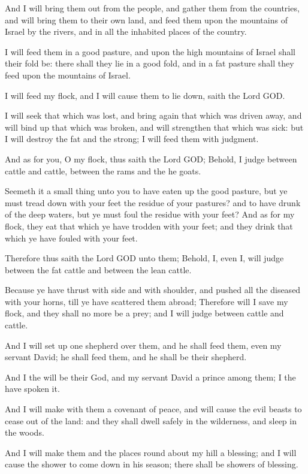 \verse And I will bring them out from the people, and gather them from the countries, and will bring them to their own land, and feed them upon the mountains of Israel by the rivers, and in all the inhabited places of the country.

\verse I will feed them in a good pasture, and upon the high mountains of Israel shall their fold be: there shall they lie in a good fold, and in a fat pasture shall they feed upon the mountains of Israel.

\verse I will feed my flock, and I will cause them to lie down, saith the Lord GOD.

\verse I will seek that which was lost, and bring again that which was driven away, and will bind up that which was broken, and will strengthen that which was sick: but I will destroy the fat and the strong; I will feed them with judgment.

\verse And as for you, O my flock, thus saith the Lord GOD; Behold, I judge between cattle and cattle, between the rams and the he goats.

\verse Seemeth it a small thing unto you to have eaten up the good pasture, but ye must tread down with your feet the residue of your pastures? and to have drunk of the deep waters, but ye must foul the residue with your feet?  \verse And as for my flock, they eat that which ye have trodden with your feet; and they drink that which ye have fouled with your feet.

\verse Therefore thus saith the Lord GOD unto them; Behold, I, even I, will judge between the fat cattle and between the lean cattle.

\verse Because ye have thrust with side and with shoulder, and pushed all the diseased with your horns, till ye have scattered them abroad; \verse Therefore will I save my flock, and they shall no more be a prey; and I will judge between cattle and cattle.

\verse And I will set up one shepherd over them, and he shall feed them, even my servant David; he shall feed them, and he shall be their shepherd.

\verse And I the \LORD will be their God, and my servant David a prince among them; I the \LORD have spoken it.

\verse And I will make with them a covenant of peace, and will cause the evil beasts to cease out of the land: and they shall dwell safely in the wilderness, and sleep in the woods.

\verse And I will make them and the places round about my hill a blessing; and I will cause the shower to come down in his season; there shall be showers of blessing.

